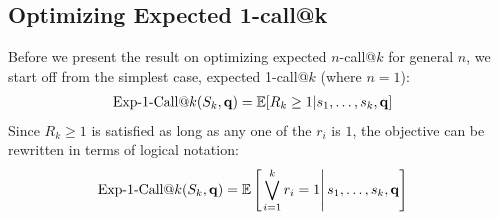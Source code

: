 \subsection{Optimizing Expected 1-call@k}
Before we present the result on optimizing expected $n$-call@$k$ for
general $n$, we start off from the simplest case, expected 1-call@$k$
(where $n=1$):
\begin{align}
    \ExpOneCall(S_k,\vec{q}) & = \mathbb{E}[R_k\geq 1|s_1,\dots,s_k,\vec{q}]
\end{align}
Since $R_k\geq 1$ is satisfied as long as any one of the $r_i$ is $1$,
the objective can be rewritten in terms of logical notation:
\begin{align}
\label{eq:setRelevance}
    \ExpOneCall(S_k,\vec{q}) & = \mathbb{E} \left[\left. \bigvee_{i=1}^{k}r_i=1 \right| s_{1},\dots, s_{k},\vec{q} \right]
\end{align}

